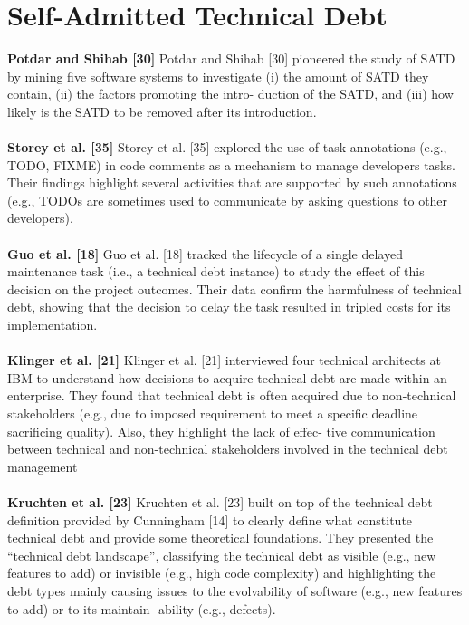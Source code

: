\section{Self-Admitted Technical Debt}

\textbf{Potdar and Shihab [30]}
Potdar and Shihab [30] pioneered the study of SATD by mining five software systems to investigate (i) the amount of SATD they contain, (ii) the factors promoting the intro- duction of the SATD, and (iii) how likely is the SATD to be removed after its introduction.
\\
\\
\textbf{Storey et al. [35]}
Storey et al. [35] explored the use of task annotations (e.g., TODO, FIXME) in code comments as a mechanism to manage developers tasks. Their findings highlight several
activities that are supported by such annotations (e.g., TODOs are sometimes used to communicate by asking questions to other developers).
\\
\\
\textbf{Guo et al. [18]}
Guo et al. [18] tracked the lifecycle of a single delayed maintenance task (i.e., a technical debt instance) to study the effect of this decision on the project outcomes. Their data confirm the harmfulness of technical debt, showing that the decision to delay the task resulted in tripled costs for its implementation.
\\
\\
\textbf{Klinger et al. [21]}
Klinger et al. [21] interviewed four technical architects at IBM to understand how decisions to acquire technical debt are made within an enterprise. They found that technical debt is often acquired due to non-technical stakeholders
(e.g., due to imposed requirement to meet a specific deadline sacrificing quality). Also, they highlight the lack of effec- tive communication between technical and non-technical stakeholders involved in the technical debt management
\\
\\
\textbf{Kruchten et al. [23]}
Kruchten et al. [23] built on top of the technical debt definition provided by Cunningham [14] to clearly define what constitute technical debt and provide some theoretical foundations. They presented the “technical debt landscape”, classifying the technical debt as visible (e.g., new features to add) or invisible (e.g., high code complexity) and highlighting the debt types mainly causing issues to the evolvability of software (e.g., new features to add) or to its maintain- ability (e.g., defects).
